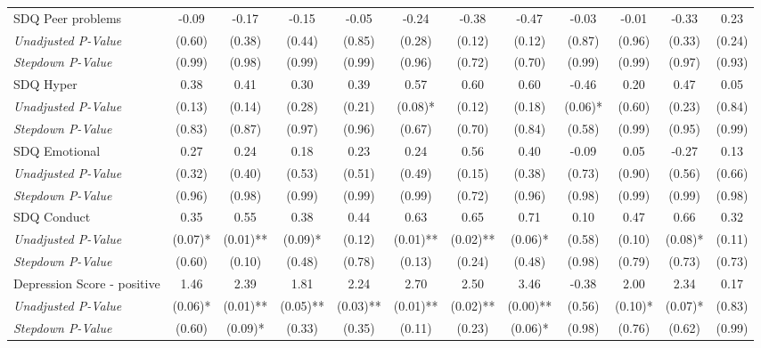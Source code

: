 \begin{tabular}{l c c c c c c c c c c c}
SDQ Peer problems & -0.09 & -0.17 & -0.15 & -0.05 & -0.24 & -0.38 & -0.47 & -0.03 & -0.01 & -0.33 & 0.23 \\
\quad \textit{Unadjusted P-Value} & (0.60) & (0.38) & (0.44) & (0.85) & (0.28) & (0.12) & (0.12) & (0.87) & (0.96) & (0.33) & (0.24) \\
\quad \textit{Stepdown P-Value} & (0.99) & (0.98) & (0.99) & (0.99) & (0.96) & (0.72) & (0.70) & (0.99) & (0.99) & (0.97) & (0.93) \\
SDQ Hyper & 0.38 & 0.41 & 0.30 & 0.39 & 0.57 & 0.60 & 0.60 & -0.46 & 0.20 & 0.47 & 0.05 \\
\quad \textit{Unadjusted P-Value} & (0.13) & (0.14) & (0.28) & (0.21) & (0.08)* & (0.12) & (0.18) & (0.06)* & (0.60) & (0.23) & (0.84) \\
\quad \textit{Stepdown P-Value} & (0.83) & (0.87) & (0.97) & (0.96) & (0.67) & (0.70) & (0.84) & (0.58) & (0.99) & (0.95) & (0.99) \\
SDQ Emotional & 0.27 & 0.24 & 0.18 & 0.23 & 0.24 & 0.56 & 0.40 & -0.09 & 0.05 & -0.27 & 0.13 \\
\quad \textit{Unadjusted P-Value} & (0.32) & (0.40) & (0.53) & (0.51) & (0.49) & (0.15) & (0.38) & (0.73) & (0.90) & (0.56) & (0.66) \\
\quad \textit{Stepdown P-Value} & (0.96) & (0.98) & (0.99) & (0.99) & (0.99) & (0.72) & (0.96) & (0.98) & (0.99) & (0.99) & (0.98) \\
SDQ Conduct & 0.35 & 0.55 & 0.38 & 0.44 & 0.63 & 0.65 & 0.71 & 0.10 & 0.47 & 0.66 & 0.32 \\
\quad \textit{Unadjusted P-Value} & (0.07)* & (0.01)** & (0.09)* & (0.12) & (0.01)** & (0.02)** & (0.06)* & (0.58) & (0.10) & (0.08)* & (0.11) \\
\quad \textit{Stepdown P-Value} & (0.60) & (0.10) & (0.48) & (0.78) & (0.13) & (0.24) & (0.48) & (0.98) & (0.79) & (0.73) & (0.73) \\
Depression Score - positive & 1.46 & 2.39 & 1.81 & 2.24 & 2.70 & 2.50 & 3.46 & -0.38 & 2.00 & 2.34 & 0.17 \\
\quad \textit{Unadjusted P-Value} & (0.06)* & (0.01)** & (0.05)** & (0.03)** & (0.01)** & (0.02)** & (0.00)** & (0.56) & (0.10)* & (0.07)* & (0.83) \\
\quad \textit{Stepdown P-Value} & (0.60) & (0.09)* & (0.33) & (0.35) & (0.11) & (0.23) & (0.06)* & (0.98) & (0.76) & (0.62) & (0.99) \\
\bottomrule
\end{tabular}

